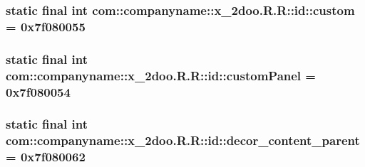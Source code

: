 \hypertarget{classcom_1_1companyname_1_1x__2doo_1_1_r_1_1id_1d9edc1c8ab47fb335cbd1c806eb327b}{
\subsubsection[{custom}]{\setlength{\rightskip}{0pt plus 5cm}static final int com::companyname::x\_\-2doo.R.R::id::custom = 0x7f080055}}
\label{classcom_1_1companyname_1_1x__2doo_1_1_r_1_1id_1d9edc1c8ab47fb335cbd1c806eb327b}


\hypertarget{classcom_1_1companyname_1_1x__2doo_1_1_r_1_1id_cadc49c92c4628619e92ac8f997b2e76}{
\subsubsection[{customPanel}]{\setlength{\rightskip}{0pt plus 5cm}static final int com::companyname::x\_\-2doo.R.R::id::customPanel = 0x7f080054}}
\label{classcom_1_1companyname_1_1x__2doo_1_1_r_1_1id_cadc49c92c4628619e92ac8f997b2e76}


\hypertarget{classcom_1_1companyname_1_1x__2doo_1_1_r_1_1id_b192e616b2f3221aee773aecfe593e2a}{
\subsubsection[{decor\_\-content\_\-parent}]{\setlength{\rightskip}{0pt plus 5cm}static final int com::companyname::x\_\-2doo.R.R::id::decor\_\-content\_\-parent = 0x7f080062}}
\label{classcom_1_1companyname_1_1x__2doo_1_1_r_1_1id_b192e616b2f3221aee773aecfe593e2a}


